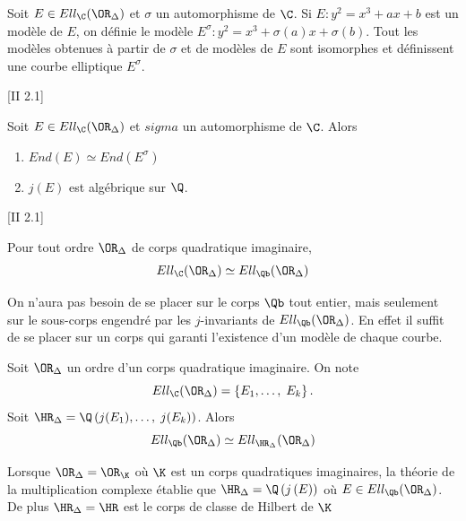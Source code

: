 \begin{Def}
	Soit $E\in Ell_{\C}(\OR_{\Delta})$ et $\sigma$ un automorphisme de $\C$. Si $E : y^2 = x^3 + ax + b$ est un modèle de $E$, on définie le modèle $E^{\sigma} : y^2 = x^3 + \sigma(a)x + \sigma(b)$. Tout les modèles obtenues à partir de $\sigma$ et de modèles de $E$ sont isomorphes et définissent une courbe elliptique $E^{\sigma}$.
\end{Def}

\begin{Prop}\cite{Sil94}[II 2.1]
	
	Soit $E\in Ell_{\C}(\OR_{\Delta})$ et $sigma$ un automorphisme de $\C$. Alors
	\begin{enumerate}
		\item $End(E)\simeq End(E^{\sigma})$
		\item $j(E)$ est algébrique sur $\Q$.
	\end{enumerate}
	
\end{Prop}

\begin{Prop}\cite{Sil94}[II 2.1]
	
	Pour tout ordre $\OR_{\Delta}$ de corps quadratique imaginaire,
	\begin{equation*}
		Ell_{\C}(\OR_{\Delta})\simeq Ell_{\Qb}(\OR_{\Delta})
	\end{equation*}
\end{Prop}


On n'aura pas besoin de se placer sur le corps $\Qb$ tout entier, mais seulement sur le sous-corps engendré par les $j$-invariants de $Ell_{\Qb}(\OR_{\Delta})$. En effet il suffit de se placer sur un corps qui garanti l'existence d'un modèle de chaque courbe.

\begin{Prop}
	
	Soit $\OR_{\Delta}$ un ordre d'un corps quadratique imaginaire. On note
	\begin{equation*}
		Ell_{\C}(\OR_{\Delta}) = \left\lbrace E_{1},\ldots,\;E_{k}\right\rbrace .
	\end{equation*}
    Soit $\HR_{\Delta} = \Q\left( j(E_{1}),\ldots,\;j(E_{k})\right) $. Alors
	\begin{equation*}
		Ell_{\Qb}(\OR_{\Delta})\simeq Ell_{\HR_{\Delta}}(\OR_{\Delta})
	\end{equation*}
\end{Prop}


Lorsque $\OR_{\Delta} = \OR_{\K}$ où $\K$ est un corps quadratiques imaginaires, la théorie de la multiplication complexe établie que $\HR_{\Delta} = \Q\left( j\left( E\right) \right)$ où $E\in Ell_{\Qb}(\OR_{\Delta})$. De plus $\HR_{\Delta} = \HR$ est le corps de classe de Hilbert de $\K$

